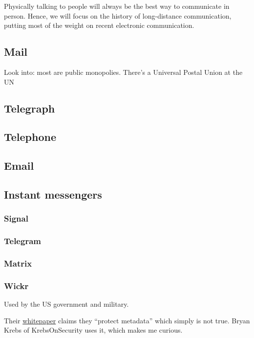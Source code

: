 \documentclass[sigconf, nonacm, balance=false, natbib=false]{acmart}
\begin{document}
Physically talking to people will always be the best way to communicate in person. Hence, we will focus on the history of long-distance communication, putting most of the weight on recent electronic communication.

\subsection{Mail}

Look into:
most are public monopolies.
There's a Universal Postal Union at the UN

\subsection{Telegraph}

\subsection{Telephone}

\subsection{Email}

\subsection{Instant messengers}

\subsubsection{Signal}

\subsubsection{Telegram}

\subsubsection{Matrix}

\subsubsection{Wickr}

Used by the US government and military.

Their \href{https://wickr.com/wp-content/uploads/2019/12/WhitePaper_WickrMessagingProtocol.pdf}{whitepaper} claims they ``protect metadata'' which simply is not true. Bryan Krebs of KrebsOnSecurity uses it, which makes me curious.
\end{document}
